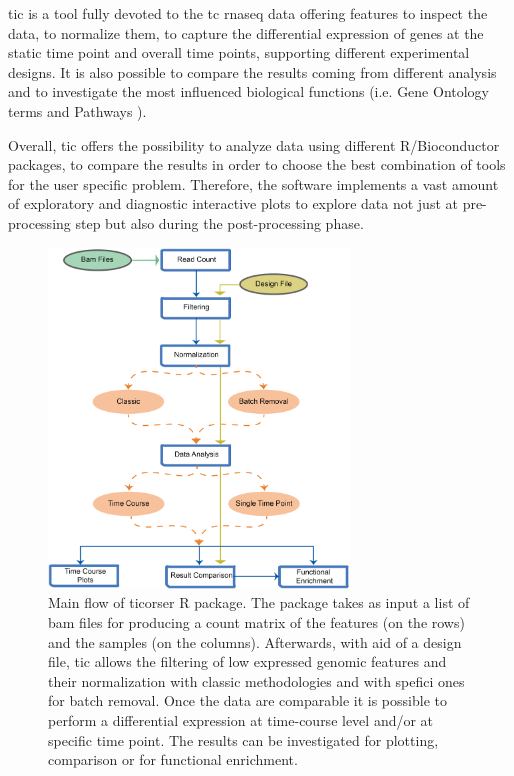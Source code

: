 \Gls{tic} is a tool fully devoted to the \gls{tc} \gls{rnaseq} data offering features to inspect the data, to normalize them, to capture the differential expression of genes at the static time point and overall time points, supporting different experimental designs.
It is also possible to compare the results coming from different analysis and to investigate the most influenced biological functions (i.e. Gene Ontology terms and Pathways \cite{GeneOntologyConsortium2004, GeneOntologyConsortium2015} ).

Overall, \gls{tic} offers the possibility to analyze data using different R/Bioconductor \cite{Gentleman2004} packages, to compare the results in order to choose the best combination of tools for the user specific problem. Therefore, the software implements a vast amount of exploratory and diagnostic interactive plots to explore data not just at pre-processing step but also during the post-processing phase. 


\begin{figure}[h]
\centering
\includegraphics[width=8cm, keepaspectratio]{img/ticorser/main_flow.pdf}
\caption[ticorser mainflow]{Main flow of ticorser R package.
The package takes as input a list of bam files for producing a count matrix of the features (on the rows) and the samples (on the columns).
Afterwards, with aid of a design file, \gls{tic} allows the filtering of low expressed genomic features and their normalization with classic methodologies and with spefici ones for batch removal.
Once the data are comparable it is possible to perform a differential expression at time-course level and/or at specific time point.
The results can be investigated for plotting, comparison or for functional enrichment.}
\label{fig:ticorserflow}
\end{figure}


